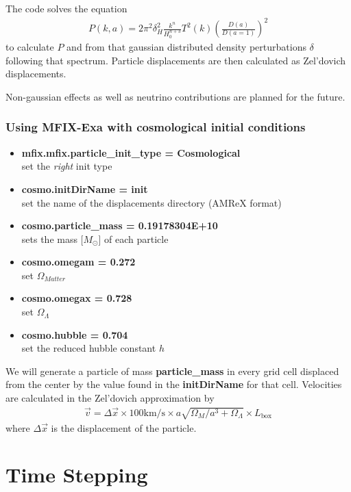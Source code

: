 	The code solves the equation
	\begin{align}
	P(k,a) = 2\pi^2\delta^2_H \frac{k^n}{H_0^{n+3}}T^2(k)\left( \frac{D(a)}{D(a=1)} \right)^2
	\end{align}
	to calculate $P$ and from that gaussian distributed density perturbations
	$\delta$ following that spectrum. Particle displacements are then calculated
	as Zel'dovich displacements.
	
	Non-gaussian effects as well as neutrino contributions are planned for the
	future.
	
\subsubsection{Using MFIX-Exa with cosmological initial conditions}
	\begin{itemize}
		\item {\bf mfix.mfix.particle\_init\_type = Cosmological} \\ 
			set the \emph{right} init type
		\item {\bf cosmo.initDirName = init} \\
			set the name of the displacements directory (AMReX format)
		\item {\bf cosmo.particle\_mass = 0.19178304E+10} \\
			sets the mass [$M_\odot$] of each particle
		\item {\bf cosmo.omegam = 0.272} \\
			set $\Omega_{Matter}$
		\item {\bf cosmo.omegax = 0.728} \\
			set $\Omega_\Lambda$
		\item {\bf cosmo.hubble = 0.704} \\
			set the reduced hubble constant $h$
	\end{itemize}
	
	We will generate a particle of mass \textbf{particle\_mass} in every grid cell
	displaced from the center by the value found in the \textbf{initDirName} for
	that cell. Velocities are calculated in the Zel'dovich approximation by
	\begin{align}
		\vec{v} = \Delta{\vec{x}} \times 100 \text{km/s} \times a \sqrt{\Omega_M/a^3+\Omega_\Lambda} \times L_{\text{box}}
	\end{align}
	where $\Delta{\vec{x}}$ is the displacement of the particle.
	
\section{Time Stepping}

